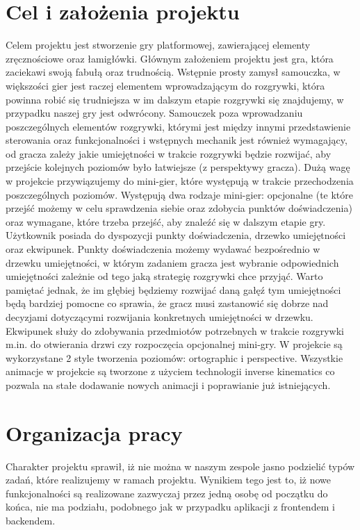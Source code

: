 \documentclass[oneside,polski,logo]{amuthesis}
\begin{document}
\section{Cel i założenia projektu}
Celem projektu jest stworzenie gry platformowej, zawierającej elementy zręcznościowe oraz łamigłówki. Głównym założeniem projektu jest gra, która zaciekawi swoją fabułą oraz trudnością. Wstępnie prosty zamysł samouczka, w większości gier jest raczej elementem wprowadzającym do rozgrywki, która powinna robić się trudniejsza w im dalszym etapie rozgrywki się znajdujemy, w przypadku naszej gry jest odwrócony. Samouczek poza wprowadzaniu poszczególnych elementów rozgrywki, którymi jest między innymi przedstawienie sterowania oraz funkcjonalności i wstępnych mechanik jest również wymagający, od gracza zależy jakie umiejętności w trakcie rozgrywki będzie rozwijać, aby przejście kolejnych poziomów było łatwiejsze (z perspektywy gracza). Dużą wagę w projekcie przywiązujemy do mini-gier, które występują w trakcie przechodzenia poszczególnych poziomów. Występują dwa rodzaje mini-gier: opcjonalne (te które przejść możemy w celu sprawdzenia siebie oraz zdobycia punktów doświadczenia) oraz wymagane, które trzeba przejść, aby znaleźć się w dalszym etapie gry. Użytkownik posiada do dyspozycji punkty doświadczenia, drzewko umiejętności oraz ekwipunek. Punkty doświadczenia możemy wydawać bezpośrednio w drzewku umiejętności, w którym zadaniem gracza jest wybranie odpowiednich umiejętności zależnie od tego jaką strategię rozgrywki chce przyjąć. Warto pamiętać jednak, że im głębiej będziemy rozwijać daną gałęź tym umiejętności będą bardziej pomocne co sprawia, że gracz musi zastanowić się dobrze nad decyzjami dotyczącymi rozwijania konkretnych umiejętności w drzewku. Ekwipunek służy do zdobywania przedmiotów potrzebnych w trakcie rozgrywki m.in. do otwierania drzwi czy rozpoczęcia opcjonalnej mini-gry. W projekcie są wykorzystane 2 style tworzenia poziomów: ortographic i perspective. Wszystkie animacje w projekcie są tworzone z użyciem technologii inverse kinematics co pozwala na stałe dodawanie nowych animacji i poprawianie już istniejących.
\section{Organizacja pracy}
Charakter projektu sprawił, iż nie można w naszym zespole jasno podzielić typów zadań, które realizujemy w ramach projektu. Wynikiem tego jest to, iż nowe funkcjonalności są realizowane zazwyczaj przez jedną osobę od początku do końca, nie ma podziału, podobnego jak w przypadku aplikacji z frontendem i backendem.
\end{document}
